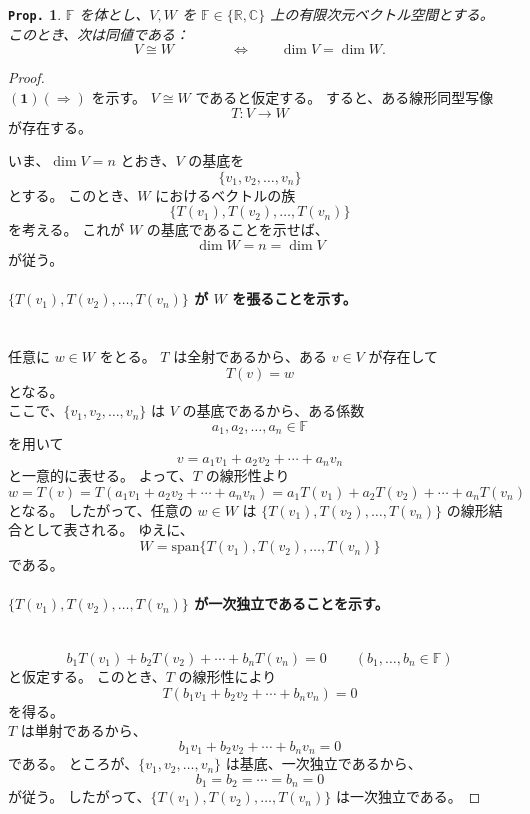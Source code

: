 \documentclass[dvipdfmx,a4paper]{jsarticle}
\theoremstyle{mystyle}
\newtheorem{prop}[dfn]{\texttt{Prop.}}
\begin{document}
\appendix
\section*{}
\begin{prop}\label{proof:dim}
$\mathbb{F}$ を体とし、$V,W$ を $\mathbb{F}\in \{\mathbb{R}, \mathbb{C}\}$ 上の有限次元ベクトル空間とする。
このとき、次は同値である：
\[
V \cong W \qquad 
\qquad \Longleftrightarrow \qquad
\dim V = \dim W.
\]
\end{prop}

\begin{proof}
\ \\
$\mathbf{(1)}$\quad $(\Rightarrow)$ を示す。
$V \cong W$ であると仮定する。
すると、ある線形同型写像
\[
T:V\to W
\]
が存在する。

\medskip
\noindent
いま、$\dim V=n$ とおき、$V$ の基底を
\[
\{v_1,v_2,\dots,v_n\}
\]
とする。
このとき、$W$ におけるベクトルの族
\[
\{T(v_1),T(v_2),\dots,T(v_n)\}
\]
を考える。
これが $W$ の基底であることを示せば、
\[
\dim W=n=\dim V
\]
が従う。

\paragraph{$\{T(v_1),T(v_2),\dots,T(v_n)\}$ \textbf{が} $W$ \textbf{を張ることを示す。}} \ \\
任意に $w\in W$ をとる。
$T$ は全射であるから、ある $v\in V$ が存在して
\[
T(v)=w
\]
となる。\\
\noindent
ここで、$\{v_1,v_2,\dots,v_n\}$ は $V$ の基底であるから、ある係数
\[
a_1,a_2,\dots,a_n\in\mathbb{F}
\]
を用いて
\[
v=a_1v_1+a_2v_2+\cdots+a_nv_n
\]
と一意的に表せる。
よって、$T$ の線形性より
\[
w=T(v)
=T(a_1v_1+a_2v_2+\cdots+a_nv_n)
=a_1T(v_1)+a_2T(v_2)+\cdots+a_nT(v_n)
\]
となる。
したがって、任意の $w\in W$ は $\{T(v_1),T(v_2),\dots,T(v_n)\}$ の線形結合として表される。
ゆえに、
\[
W=\mathrm{span}\{T(v_1),T(v_2),\dots,T(v_n)\}
\]
である。

\paragraph{$\{T(v_1),T(v_2),\dots,T(v_n)\}$ \textbf{が一次独立であることを示す。}} \ \\
\[
b_1T(v_1)+b_2T(v_2)+\cdots+b_nT(v_n)=0
\qquad (b_1,\dots,b_n\in\mathbb{F})
\]
と仮定する。
このとき、$T$ の線形性により
\[
T(b_1v_1+b_2v_2+\cdots+b_nv_n)=0
\]
を得る。\\
\noindent
$T$ は単射であるから、
\[
b_1v_1+b_2v_2+\cdots+b_nv_n=0
\]
である。
ところが、$\{v_1,v_2,\dots,v_n\}$ は基底、一次独立であるから、
\[
b_1=b_2=\cdots=b_n=0
\]
が従う。
したがって、$\{T(v_1),T(v_2),\dots,T(v_n)\}$ は一次独立である。


\end{proof}
\end{document}
